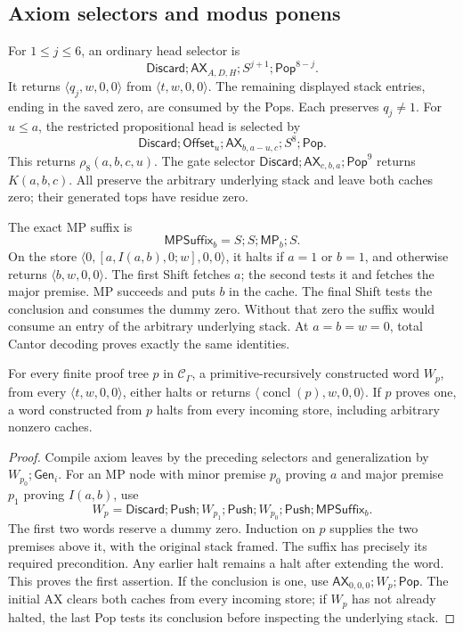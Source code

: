 \subsection{Axiom selectors and modus ponens}

For $1\le j\le6$, an ordinary head selector is
\[
 \mathsf{Discard};\mathsf{AX}_{A,D,H};S^{j+1};\mathsf{Pop}^{8-j}.
\]
It returns $\langle q_j,w,0,0\rangle$ from
$\langle t,w,0,0\rangle$. The remaining displayed stack entries, ending
in the saved zero, are consumed by the Pops. Each preserves $q_j\ne1$.
For $u\le a$, the restricted propositional head is selected by
\[
 \mathsf{Discard};\mathsf{Offset}_u;\mathsf{AX}_{b,a-u,c};S^8;\mathsf{Pop}.
\]
This returns $\rho_8(a,b,c,u)$. The gate selector
$\mathsf{Discard};\mathsf{AX}_{c,b,a};\mathsf{Pop}^9$
returns $K(a,b,c)$. All preserve the arbitrary underlying stack and leave
both caches zero; their generated tops have residue zero.

The exact MP suffix is
\[
 \mathsf{MPSuffix}_b=S;S;\mathsf{MP}_b;S.
\]
On the store $\langle0,[a,I(a,b),0;w],0,0\rangle$, it halts if $a=1$
or $b=1$, and otherwise returns $\langle b,w,0,0\rangle$. The first
Shift fetches $a$; the second tests it and fetches the major premise.
MP succeeds and puts $b$ in the cache. The final Shift tests the conclusion
and consumes the dummy zero. Without that zero the suffix would consume
an entry of the arbitrary underlying stack. At $a=b=w=0$, total Cantor
decoding proves exactly the same identities.

\begin{lemma}\label{lem:command-compiler}
For every finite proof tree $p$ in $\mathcal C_\Gamma$, a primitive-recursively
constructed word $W_p$, from every $\langle t,w,0,0\rangle$, either halts
or returns $\langle\operatorname{concl}(p),w,0,0\rangle$.
If $p$ proves one, a word constructed from $p$ halts from every incoming
store, including arbitrary nonzero caches.
\end{lemma}
\begin{proof}
Compile axiom leaves by the preceding selectors and generalization by
$W_{p_0};\mathsf{Gen}_i$. For an MP node with minor premise $p_0$ proving
$a$ and major premise $p_1$ proving $I(a,b)$, use
\[
 W_p=\mathsf{Discard};\mathsf{Push};W_{p_1};\mathsf{Push};
                            W_{p_0};\mathsf{Push};\mathsf{MPSuffix}_b.
\]
The first two words reserve a dummy zero. Induction on $p$ supplies the two
premises above it, with the original stack framed. The suffix has precisely
its required precondition. Any earlier halt remains a halt after extending
the word. This proves the first assertion. If the conclusion is one, use
$\mathsf{AX}_{0,0,0};W_p;\mathsf{Pop}$. The initial AX clears both
caches from every incoming store; if $W_p$ has not already halted, the last
Pop tests its conclusion before inspecting the underlying stack.
\end{proof}

